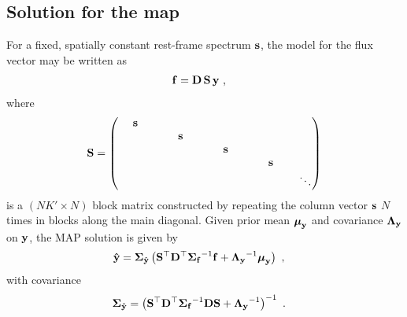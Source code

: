 \documentclass[modern]{aastex631}
\begin{document}
\subsection{Solution for the map}
\label{sec:solve_y}
%
For a fixed, spatially constant rest-frame spectrum ${\mathbf{s}}$, the model for the flux vector may be written as
%
\begin{align}
    \label{eq:inverse:fy}
    {\ensuremath{\mathbf{f}}}
     & =
    {\mathbf{D}}
    \,
    {\mathbf{S}}
    \,
    {\mathbf{y}}
    \hskip 0.33em,
\end{align}
%
where
%
\begin{align}
    \label{eq:inverse:S}
    \bvec{S} =
    \begin{pmatrix}
        \quadquad\bvec{s}\quadquad &                            &                            &                            &        \\
                                   & \quadquad\bvec{s}\quadquad &                            &                            &        \\
                                   &                            & \quadquad\bvec{s}\quadquad &                            &        \\
                                   &                            &                            & \quadquad\bvec{s}\quadquad &        \\
                                   &                            &                            &                            & \ddots
    \end{pmatrix}
\end{align}
%
is a $(NK' \times N)$ block matrix constructed by repeating the column vector ${\mathbf{s}}$ $N$ times in blocks along the main diagonal.
%
Given prior mean $\boldsymbol{\mu}_{\mathbf{y}}$ and covariance $\boldsymbol{\Lambda}_{\mathbf{y}}$ on ${\mathbf{y}}$, the MAP solution is given by
%
\begin{align}
    \label{eq:inverse:y1hat}
    {\ensuremath{\mathbf{\hat{y}}}} & =
    \boldsymbol{\Sigma}_\mathbf{\hat{y}}
    \left(
    {\mathbf{S}}^\top{\ensuremath{\mathbf{D}}}^\top
    {\boldsymbol{\Sigma}_\mathbf{f}}^{-1}
    {\mathbf{f}}
    +
    {\boldsymbol{\Lambda}_{\mathbf{y}}}^{-1} \boldsymbol{\mu}_{\mathbf{y}}
    \right)
    \hskip 0.33em,
\end{align}
%
with covariance
%
\begin{align}
    \label{eq:inverse:y1cov}
    \boldsymbol{\Sigma}_{\mathbf{\hat{y}}} & =
    \left(
    {\mathbf{S}}^\top{\ensuremath{\mathbf{D}}}^\top
    {\boldsymbol{\Sigma}_{\ensuremath{\mathbf{f}}}}^{-1}
    {\mathbf{D}}{\mathbf{S}}
    +
    {\boldsymbol{\Lambda}_{\mathbf{y}}}^{-1}
    \right)^{-1}
    \hskip 0.33em.
\end{align}
\end{document}
